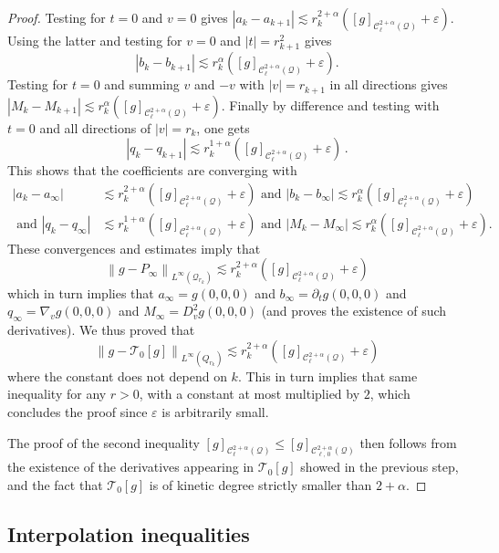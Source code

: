 \documentclass[10pt]{amsart}
\theoremstyle{definition}\newtheorem{defi}[theo]{Definition}\newtheorem{rema}[theo]{Remark}\newtheorem{exam}[theo]{Example}\newtheorem{exem}[theo]{Example}\newtheorem{nota}[theo]{Notation}
\newcommand{\cC}{\mathcal{C}}
\newcommand{\cT}{\mathcal{T}}
\newcommand{\cQ}{\mathcal{Q}}
\newcommand*\eps{\varepsilon}
\begin{document}
\begin{proof}
Testing for $t=0$ and $v=0$ gives $|a_{k}-a_{k+1}| \lesssim r_{k}^{2+\alpha} ([g]_{\cC_\ell^{2+\alpha}(\cQ)}+\eps)$. Using the latter and testing for $v=0$ and $|t|=r_{k+1}^2$ gives
\[
\left|b_{k} - b_{k+1}\right| \lesssim r_{k}^{\alpha} \left([g]_{\cC_\ell^{2+\alpha}(\cQ)}+\eps\right).
\]
Testing for $t=0$ and summing $v$ and $-v$ with $|v|=r_{k+1}$ in all directions gives $|M_{k} - M_{k+1}| \lesssim r_{k}^{\alpha} ([g]_{\cC_\ell^{2+\alpha}(\cQ)}+\eps)$. Finally by difference and testing with $t=0$ and all directions of $|v|=r_k$, one gets
\[
\left|q_{k} - q_{k+1}\right| \lesssim r_{k}^{1+\alpha} \left([g]_{\cC_\ell^{2+\alpha}(\cQ)}+\eps\right)\,.
\]
This shows that the coefficients are converging with
\begin{align*}
\left|a_{k}-a_{\infty}\right| &\lesssim r_{k}^{2+\alpha} \left([g]_{\cC_\ell^{2+\alpha}(\cQ)}+\eps\right)\text{ and }\left|b_{k} - b_{\infty}\right| \lesssim r_{k}^{\alpha} \left([g]_{\cC_\ell^{2+\alpha}(\cQ)}+\eps\right)\\ 
\text{ and }\left|q_{k} - q_{\infty}\right| &\lesssim r_{k}^{1+\alpha} \left([g]_{\cC_\ell^{2+\alpha}(\cQ)}+\eps\right)
\text{ and }\left|M_{k} - M_{\infty}\right| \lesssim r_{k}^{\alpha} \left([g]_{\cC_\ell^{2+\alpha}(\cQ)}+\eps\right).
\end{align*}
These convergences and estimates imply that
\[
\left\| g - P_\infty \right\|_{L^\infty\left(\cQ_{r_k}\right)} \lesssim r_{k}^{2+\alpha} \left([g]_{\cC_\ell^{2+\alpha}(\cQ)}+\eps\right)
\]
which in turn implies that $a_\infty = g(0,0,0)$ and $b_\infty = \partial_t g(0,0,0)$ and $q_\infty = \nabla_v g(0,0,0)$ and $M_\infty = D^2 _v g(0,0,0)$ (and proves the existence of such derivatives). We thus proved that
\[
\left\|g-\cT_0[g] \right\|_{L^\infty\left(Q_{r_k}\right)} \lesssim r_{k}^{2+\alpha} \left([g]_{\cC_\ell^{2+\alpha}(\cQ)}+\eps\right)
\]
where the constant does not depend on $k$. This in turn implies that same inequality for any $r>0$, with a constant at most multiplied by $2$, which concludes the proof since $\eps$ is arbitrarily small.

The proof of the second inequality $[g]_{\cC_\ell^{2+\alpha}(\cQ)} \le [g]_{\cC_{\ell,\,0}^{2+\alpha}(\cQ)}$ then follows from the existence of the derivatives appearing in $\cT_0[g]$ showed in the previous step, and the fact that $\cT_{0}[g]$ is of kinetic degree strictly smaller than $2+\alpha$.
\end{proof}



\subsection{Interpolation inequalities}
\end{document}
